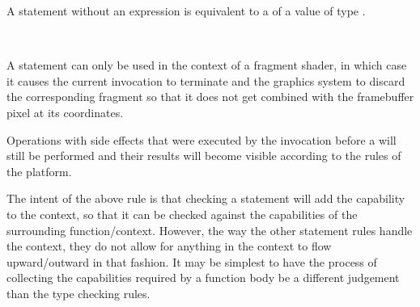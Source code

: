 \begin{Checking}
\end{Checking}

\begin{Description}
	A  statement without an expression is equivalent to a  of a value of type .
\end{Description}


\begin{Syntax}
		 \code{;} \\
\end{Syntax}

\begin{Description}
A  statement can only be used in the context of a fragment shader, in which case it causes the current invocation to terminate and the graphics system to discard the corresponding fragment so that it does not get combined with the framebuffer pixel at its coordinates.

Operations with side effects that were executed by the invocation before a  will still be performed and their results will become visible according to the rules of the platform.	
\end{Description}

\begin{Checking}
\end{Checking}

\begin{Incomplete}
The intent of the above rule is that checking a  statement will add the  capability to the context, so that it can be checked against the capabilities of the surrounding function/context.
However, the way the other statement rules handle the context, they do not allow for anything in the context to flow upward/outward in that fashion.
It may be simplest to have the process of collecting the capabilities required by a function body be a different judgement than the type checking rules.
\end{Incomplete}
	